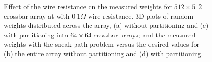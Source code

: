 \documentclass[english]{article}
\begin{document}
\begin{figure}[!t]
\centering
\vspace{-0.15in}
\hfil
{}
\hfil
{}
\hfil
{}
\vspace{-0.05in}
\caption{Effect of the wire resistance on the measured weights for $512\times 512$ crossbar array at with $0.1\Omega$ wire resistance. 3D plots of random weights distributed across the array, (a) without partitioning and (c) with partitioning into $64\times 64$ crossbar arrays; and the measured weights with the sneak path problem versus the desired values for (b) the entire array without partitioning and (d) with partitioning.}
\label{SP}
\vspace{-0.05in}
\end{figure}
\end{document}
